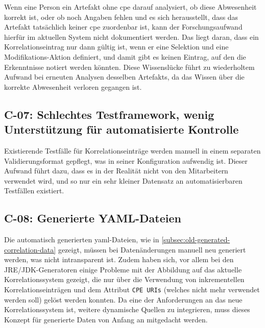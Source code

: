 Wenn eine Person ein Artefakt ohne \acrshort{cpe} darauf analysiert, ob diese Abwesenheit korrekt ist, oder ob noch Angaben fehlen und es sich herausstellt, dass das Artefakt tatsächlich keiner \acrshort{cpe} zuordenbar ist, kann der Forschungsaufwand hierfür im aktuellen System nicht dokumentiert werden.
Das liegt daran, dass ein Korrelationseintrag nur dann gültig ist, wenn er eine Selektion und eine Modifikations-Aktion definiert, und damit gibt es keinen Eintrag, auf den die Erkenntnisse notiert werden könnten.
Diese Wissenslücke führt zu wiederholtem Aufwand bei erneuten Analysen desselben Artefakts, da das Wissen über die korrekte Abwesenheit verloren gegangen ist.

\subsection{C-07: Schlechtes Testframework, wenig Unterstützung für automatisierte Kontrolle}\label{subsec:c-07-test-framework}


Existierende Testfälle für Korrelationseinträge werden manuell in einem separaten Validierungsformat gepflegt, was in seiner Konfiguration aufwendig ist.
Dieser Aufwand führt dazu, dass es in der Realität nicht von den Mitarbeitern verwendet wird, und so nur ein sehr kleiner Datensatz an automatisierbaren Testfällen existiert.

\subsection{C-08: Generierte YAML-Dateien}\label{subsec:c-08-generated-correlation-data}


Die automatisch generierten \acrshort{yaml}-Dateien, wie in \autoref{subsec:old-generated-correlation-data} gezeigt, müssen bei Datenänderungen manuell neu generiert werden, was nicht intransparent ist.
Zudem haben sich, vor allem bei den JRE/JDK-Generatoren einige Probleme mit der Abbildung auf das aktuelle Korrelationssystem gezeigt, die nur über die Verwendung von inkrementellen Korrelationseinträgen und dem Attribut \texttt{CPE URIs} (welches nicht mehr verwendet werden soll) gelöst werden konnten.
Da eine der Anforderungen an das neue Korrelationssystem ist, weitere dynamische Quellen zu integrieren, muss dieses Konzept für generierte Daten von Anfang an mitgedacht werden.

